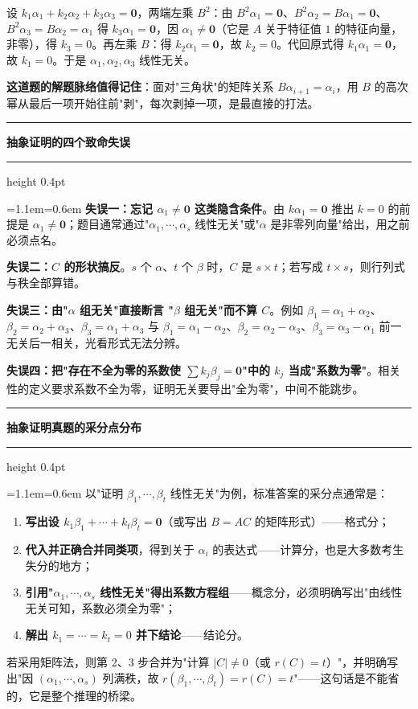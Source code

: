\documentclass[11pt,openany,UTF8]{ctexbook}
\newcommand{\callouthead}[2]{%
  \par\addvspace{7pt}\noindent
  {\color{#1}\rule[-0.15em]{3pt}{1.05em}}\hspace{0.5em}%
  {\bfseries\color{#1}#2}\par\nobreak\vspace{-0.35em}%
  {\color{rulesep}\hrule height 0.4pt}\nobreak\vspace{0.45em}%
  \begingroup\small\setlength{\parindent}{0pt}%
  \leftskip=1.1em\rightskip=0.6em\noindent\ignorespaces}
\newcommand{\calloutend}{\par\endgroup\addvspace{7pt}}
\newenvironment{callwarn}[1]{\callouthead{warnbar}{#1}}{\calloutend}
\newenvironment{callexam}[1]{\callouthead{exambar}{#1}}{\calloutend}
\begin{document}
设 $k_1\alpha_1+k_2\alpha_2+k_3\alpha_3=\mathbf{0}$，两端左乘 $B^2$：由 $B^2\alpha_1=\mathbf{0}$、$B^2\alpha_2=B\alpha_1=\mathbf{0}$、$B^2\alpha_3=B\alpha_2=\alpha_1$ 得 $k_3\alpha_1=\mathbf{0}$，因 $\alpha_1\ne\mathbf{0}$（它是 $A$ 关于特征值 $1$ 的特征向量，非零），得 $k_3=0$。再左乘 $B$：得 $k_2\alpha_1=\mathbf{0}$，故 $k_2=0$。代回原式得 $k_1\alpha_1=\mathbf{0}$，故 $k_1=0$。于是 $\alpha_1,\alpha_2,\alpha_3$ 线性无关。

\textbf{这道题的解题脉络值得记住}：面对"三角状"的矩阵关系 $B\alpha_{i+1}=\alpha_i$，用 $B$ 的高次幂从最后一项开始往前"剥"，每次剥掉一项，是最直接的打法。

\begin{callwarn}{抽象证明的四个致命失误}
\textbf{失误一：忘记 $\alpha_1\ne\mathbf{0}$ 这类隐含条件}。由 $k\alpha_1=\mathbf{0}$ 推出 $k=0$ 的前提是 $\alpha_1\ne\mathbf{0}$；题目通常通过"$\alpha_1,\cdots,\alpha_s$ 线性无关"或"$\alpha$ 是非零列向量"给出，用之前必须点名。

\textbf{失误二：$C$ 的形状搞反}。$s$ 个 $\alpha$、$t$ 个 $\beta$ 时，$C$ 是 $s\times t$；若写成 $t\times s$，则行列式与秩全部算错。

\textbf{失误三：由"$\alpha$ 组无关"直接断言 "$\beta$ 组无关"而不算 $C$}。例如 $\beta_1=\alpha_1+\alpha_2$、$\beta_2=\alpha_2+\alpha_3$、$\beta_3=\alpha_1+\alpha_3$ 与 $\beta_1=\alpha_1-\alpha_2$、$\beta_2=\alpha_2-\alpha_3$、$\beta_3=\alpha_3-\alpha_1$ 前一无关后一相关，光看形式无法分辨。

\textbf{失误四：把"存在不全为零的系数使 $\sum k_j\beta_j=\mathbf{0}$"中的 $k_j$ 当成"系数为零"}。相关性的定义要求系数不全为零，证明无关要导出"全为零"，中间不能跳步。

\end{callwarn}

\begin{callexam}{抽象证明真题的采分点分布}
以"证明 $\beta_1,\cdots,\beta_t$ 线性无关"为例，标准答案的采分点通常是：

\begin{enumerate}
\item \textbf{写出设 $k_1\beta_1+\cdots+k_t\beta_t=\mathbf{0}$}（或写出 $B=AC$ 的矩阵形式）——格式分；
\item \textbf{代入并正确合并同类项}，得到关于 $\alpha_i$ 的表达式——计算分，也是大多数考生失分的地方；
\item \textbf{引用"$\alpha_1,\cdots,\alpha_s$ 线性无关"得出系数方程组}——概念分，必须明确写出"由线性无关可知，系数必须全为零"；
\item \textbf{解出 $k_1=\cdots=k_t=0$ 并下结论}——结论分。
\end{enumerate}
若采用矩阵法，则第 2、3 步合并为"计算 $\vert C\vert\ne0$（或 $r(C)=t$）"，并明确写出"因 $(\alpha_1,\cdots,\alpha_s)$ 列满秩，故 $r(\beta_1,\cdots,\beta_t)=r(C)=t$"——这句话是不能省的，它是整个推理的桥梁。

\end{callexam}
\end{document}
